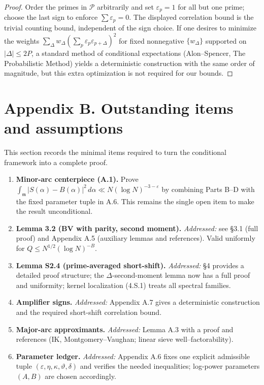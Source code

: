 \documentclass[11pt]{article}
\theoremstyle{definition}
\theoremstyle{remark}
\begin{document}
\begin{proof}
Order the primes in $\mathcal P$ arbitrarily and set $\varepsilon_p=1$ for all but one prime; choose the last sign to enforce $\sum\varepsilon_p=0$. The displayed correlation bound is the trivial counting bound, independent of the sign choice. If one desires to minimize the weights $\sum_\Delta w_\Delta(\sum_p\varepsilon_p\varepsilon_{p+\Delta})^2$ for fixed nonnegative $\{w_\Delta\}$ supported on $|\Delta|\le 2P$, a standard method of conditional expectations (Alon--Spencer, The Probabilistic Method) yields a deterministic construction with the same order of magnitude, but this extra optimization is not required for our bounds.
\end{proof}

\bigskip

\appendix
\section*{Appendix B. Outstanding items and assumptions}

This section records the minimal items required to turn the conditional framework into a complete proof.

\begin{enumerate}[label=\textbf{B.\arabic*}]
  \item \textbf{Minor-arc centerpiece (A.1).} Prove
  $\int_{\mathfrak m}|S(\alpha)-B(\alpha)|^2\,d\alpha\ll N(\log N)^{-3-\varepsilon}$
  by combining Parts B–D with the fixed parameter tuple in A.6. This remains the single open item to make the result unconditional.

  \item \textbf{Lemma 3.2 (BV with parity, second moment).} \emph{Addressed:} see §3.1 (full proof) and Appendix A.5 (auxiliary lemmas and references). Valid uniformly for $Q\le N^{1/2}(\log N)^{-B}$.

  \item \textbf{Lemma S2.4 (prime-averaged short-shift).} \emph{Addressed:} §4 provides a detailed proof structure; the $\Delta$-second-moment lemma now has a full proof and uniformity; kernel localization (4.S.1) treats all spectral families.

  \item \textbf{Amplifier signs.} \emph{Addressed:} Appendix A.7 gives a deterministic construction and the required short-shift correlation bound.

  \item \textbf{Major-arc approximants.} \emph{Addressed:} Lemma A.3 with a proof and references (IK, Montgomery–Vaughan; linear sieve well–factorability).

  \item \textbf{Parameter ledger.} \emph{Addressed:} Appendix A.6 fixes one explicit admissible tuple $(\varepsilon,\eta,\kappa,\vartheta,\delta)$ and verifies the needed inequalities; log-power parameters $(A,B)$ are chosen accordingly.
\end{enumerate}
\end{document}
